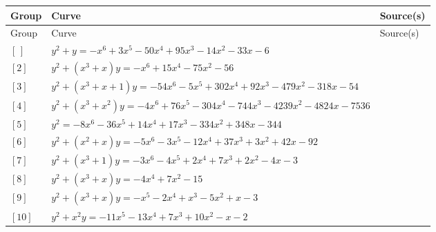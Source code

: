 \documentclass[11pt]{amsart}
\begin{document}
\begingroup\small
\renewcommand{\arraystretch}{1.25}
\begin{longtable}{|>{\raggedright\arraybackslash}p{1.7cm}|>{\raggedright\arraybackslash}p{}|>{\raggedright\arraybackslash}p{2.6cm}|}
\hline
Group & Curve & Source(s)\\ \hline
\endfirsthead
\hline
Group & Curve & Source(s)\\ \hline
\endhead
$[\,]$ & \href{https://www.lmfdb.org/Genus2Curve/Q/1083/b/390963/1}{$y^2 + y = -x^{6}+3x^{5}-50x^{4}+95x^{3}-14x^{2}-33x-6$} & \cite{BSSVY}\\ \hline
$[2]$ & \href{https://www.lmfdb.org/Genus2Curve/Q/336/a/172032/1}{$y^2 + (x^{3}+x)y = -x^{6}+15x^{4}-75x^{2}-56$} & \cite{BSSVY}\\ \hline
$[3]$ & \href{https://alpha.lmfdb.org/Genus2Curve/Q/?jump=[[-54,-318,-479,92,302,-5,-54],[1,1,0,1]]}{$y^2 + (x^{3}+x+1)y = -54x^{6}-5x^{5}+302x^{4}+92x^{3}-479x^{2}-318x-54$} & \cite{BookerSutherland}\\ \hline
$[4]$ & \href{https://alpha.lmfdb.org/Genus2Curve/Q/?jump=[[-7536,-4824,-4239,-744,-304,76,-4],[0,0,1,1]]}{$y^2 + (x^{3}+x^{2})y = -4x^{6}+76x^{5}-304x^{4}-744x^{3}-4239x^{2}-4824x-7536$} & \cite{BookerSutherland}\\ \hline
$[5]$ & \href{https://alpha.lmfdb.org/Genus2Curve/Q/?jump=[[-344,348,-334,17,14,-36,-8],[0]]}{$y^2 = -8x^{6}-36x^{5}+14x^{4}+17x^{3}-334x^{2}+348x-344$} & \cite{BookerSutherland}\\ \hline
$[6]$ & \href{https://alpha.lmfdb.org/Genus2Curve/Q/?jump=[[-92,42,3,37,-12,-3,-5],[0,1,1]]}{$y^2 + (x^{2}+x)y = -5x^{6}-3x^{5}-12x^{4}+37x^{3}+3x^{2}+42x-92$} & \cite{BookerSutherland}\\ \hline
$[7]$ & \href{https://alpha.lmfdb.org/Genus2Curve/Q/?jump=[[-3,-4,2,7,2,-4,-3],[1,0,0,1]]}{$y^2 + (x^{3}+1)y = -3x^{6}-4x^{5}+2x^{4}+7x^{3}+2x^{2}-4x-3$} & \cite{BookerSutherland}\\ \hline
$[8]$ & \href{https://alpha.lmfdb.org/Genus2Curve/Q/?jump=[[-15,0,7,0,-4],[0,1,0,1]]}{$y^2 + (x^{3}+x)y = -4x^{4}+7x^{2}-15$} & \cite{BookerSutherland}\\ \hline
$[9]$ & \href{https://alpha.lmfdb.org/Genus2Curve/Q/?jump=[[-3,1,-5,1,-2,-1],[0,1,0,1]]}{$y^2 + (x^{3}+x)y = -x^{5}-2x^{4}+x^{3}-5x^{2}+x-3$} & \cite{BookerSutherland}\\ \hline
$[10]$ & \href{https://www.lmfdb.org/Genus2Curve/Q/363/a/43923/1}{$y^2 + x^{2}y = -11x^{5}-13x^{4}+7x^{3}+10x^{2}-x-2$} & \cite{BSSVY}\\ \hline

\end{longtable}
\end{document}
